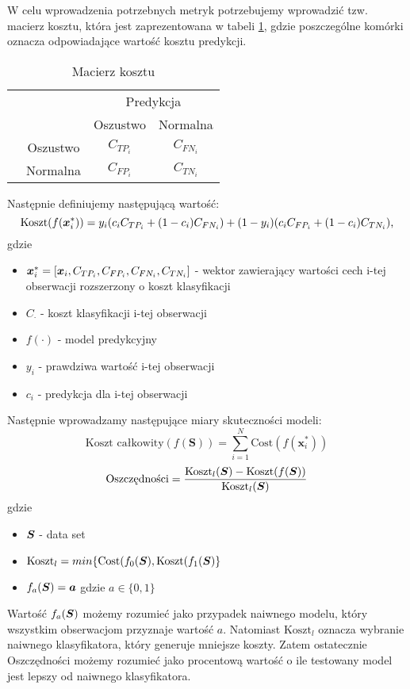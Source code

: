\documentclass{book}
\begin{document}
	W celu wprowadzenia potrzebnych metryk potrzebujemy wprowadzić tzw. macierz kosztu, która jest zaprezentowana w tabeli \ref{macierz-kosztu}, gdzie poszczególne komórki oznacza odpowiadające wartość kosztu predykcji. 
	\begin{table}[h]
		\begin{center}
			\makegapedcells
			\begin{tabular}{cc|cc}
				\multicolumn{2}{c}{}     &   \multicolumn{2}{c}{Predykcja} \\
				&            &   Oszustwo &   Normalna     \\ 
				\cline{2-4}
				\multirow{2}{*}{\rotatebox[origin=c]{90}{Prawda}} & Oszustwo   & $C_{TP_{i}}$         & $C_{FN_{i}}$              \\
				& Normalna   & $C_{FP_{i}}$         & $C_{TN_{i}}$              \\ 
				\cline{2-4}
			\end{tabular}
		\end{center}
		\caption{Macierz kosztu}
		\label{macierz-kosztu}
	\end{table}
	Następnie definiujemy następującą wartość:
	$$ \text{Koszt}(f(\boldsymbol{x}_{i}^{*})) = y_i (c_i C_{TP_i} + (1-c_i)C_{FN_i}) + (1-y_i)(c_i C_{FP_i} + (1-c_i)C_{TN_i}) \text{,}$$
	gdzie 
	\begin{itemize}
		\item $\boldsymbol{x}_{i}^{*} = [\boldsymbol{x}_i, C_{TP_{i}}, C_{FP_{i}}, C_{FN_{i}}, C_{TN_{i}}]$ - wektor zawierający wartości cech i-tej obserwacji rozszerzony o koszt klasyfikacji
		\item $C_{\cdot}$ - koszt klasyfikacji i-tej obserwacji
		\item $f(\cdot)$ - model predykcyjny
		\item $y_i$ - prawdziwa wartość i-tej obserwacji
		\item $c_i$ - predykcja dla i-tej obserwacji
	\end{itemize}{}
    Następnie wprowadzamy następujące miary skuteczności modeli:
	\begin{equation}
		\text{Koszt całkowity}(f(\boldsymbol{S})) = \sum_{i=1}^{N}\text{Cost}(f(\boldsymbol{x}_{i}^{*}))
	\end{equation} 
	\begin{equation}
		\text{Oszczędności} = \frac{\text{Koszt}_{l}(\boldsymbol{S}) - \text{Koszt}(f(\boldsymbol{S}))}{\text{Koszt}_{l}(\boldsymbol{S})}
	\end{equation}
	gdzie
	\begin{itemize}
		\item $ \boldsymbol{S} $ - data set
		\item $ \text{Koszt}_l = min\{\text{Cost}(f_{0}(\boldsymbol{S}), \text{Koszt}(f_{1}(\boldsymbol{S})\} $
		\item $ f_{a}(\boldsymbol{S}) = \boldsymbol{a} $ gdzie $a \in \{0,1\}$
	\end{itemize}{}
	Wartość $ f_{a}(\boldsymbol{S})$ możemy rozumieć jako przypadek naiwnego modelu, który wszystkim obserwacjom przyznaje wartość $a$. Natomiast $ \text{Koszt}_l $ oznacza wybranie naiwnego klasyfikatora, który generuje mniejsze koszty. Zatem ostatecznie Oszczędności możemy rozumieć jako procentową wartość o ile testowany model jest lepszy od naiwnego klasyfikatora.
	
\end{document}
